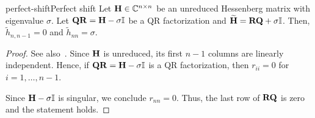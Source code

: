 \begin{Lemma*}{perfect-shift}{Perfect shift}
  Let $\mathbf H\in\mathbb C^{n\times n}$ be an unreduced Hessenberg matrix with eigenvalue
  $\sigma$. Let $\mathbf Q\mathbf R = \mathbf H - \sigma\mathbb I$ be a QR factorization
  and $\widetilde{\mathbf H} = \mathbf R\mathbf Q+\sigma\mathbb I$. Then,
  $\tilde h_{n,n-1}=0$ and $\tilde h_{nn} =\sigma$.
\end{Lemma*}

\begin{proof}
  See also~\cite[Theorem 7.5.1]{GolubVanLoan83}.  Since $\mathbf H$ is
  unreduced, its first $n-1$ columns are linearly independent. Hence,
  if $\mathbf Q\mathbf R=\mathbf H-\sigma\mathbb I$ is a QR factorization, then
  $r_{ii} = 0$ for $i=1,\dots,n-1$.

  Since $\mathbf H-\sigma\mathbb I$ is singular, we conclude $r_{nn}=0$. Thus,
  the last row of $\mathbf R\mathbf Q$ is zero and the statement holds.
\end{proof}




